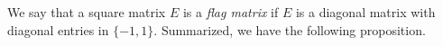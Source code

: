 \documentclass{article}
\theoremstyle{definition}
\newtheorem{lemma}[theorem]{Lemma}
\newcommand{\Null}{\mathrm{Null}}
\begin{document}

We say that a square matrix $E$ is a \emph{flag matrix} if $E$ is a diagonal matrix with diagonal entries in $\{-1,1\}$. Summarized, we have the following proposition.
\end{document}
